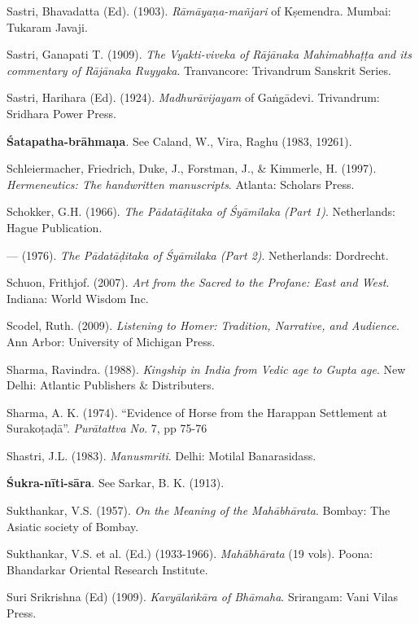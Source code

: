 \begin{thebibliography}{99}
Sastri, Bhavadatta (Ed). (1903). {\sl Rāmāyaṇa-mañjari} of Kṣemendra. Mumbai: Tukaram Javaji. 

Sastri, Ganapati T. (1909). {\sl The Vyakti-viveka of Rājānaka Mahimabhaṭṭa and its commentary of Rājānaka Ruyyaka}. Tranvancore: Trivandrum Sanskrit Series. 

Sastri, Harihara (Ed). (1924). {\sl Madhurāvijayam} of Gaṅgādevi. Trivandrum: Sridhara Power Press. 

{\bf Śatapatha-brāhmaṇa}. See Caland, W., Vira, Raghu (1983, 19261).

Schleiermacher, Friedrich, Duke, J., Forstman, J., \& Kimmerle, H. (1997). {\sl Hermeneutics: The handwritten manuscripts}. Atlanta: Scholars Press.  

Schokker, G.H. (1966). {\sl The Pādatāḍitaka of Śyāmilaka (Part 1)}. Netherlands: Hague Publication. 

--- (1976). {\sl The Pādatāḍitaka of Śyāmilaka (Part 2)}. Netherlands: Dordrecht. 

Schuon, Frithjof. (2007). {\sl Art from the Sacred to the Profane: East and West}. Indiana: World Wisdom Inc. 

Scodel, Ruth. (2009). {\sl Listening to Homer: Tradition, Narrative, and Audience}. Ann Arbor: University of Michigan Press. 

Sharma, Ravindra. (1988). {\sl Kingship in India from Vedic age to Gupta age}. New Delhi: Atlantic Publishers \& Distributers. 

Sharma, A. K. (1974). “Evidence of Horse from the Harappan Settlement at Surakoṭaḍā”. {\sl Purātattva No}. 
7, pp 75-76

Shastri, J.L. (1983). {\sl Manusmriti}. Delhi: Motilal Banarasidass. 

{\bf Śukra-nīti-sāra}. See Sarkar, B. K. (1913). 

Sukthankar, V.S. (1957). {\sl On the Meaning of the Mahābhārata}. Bombay: The Asiatic society of Bombay. 

Sukthankar, V.S. et al. (Ed.) (1933-1966). {\sl Mahābhārata} (19 vols). Poona: Bhandarkar Oriental Research Institute. 

Suri Srikrishna (Ed) (1909). {\sl Kavyālaṅkāra of Bhāmaha}. Srirangam: Vani Vilas Press. 


\end{thebibliography}
